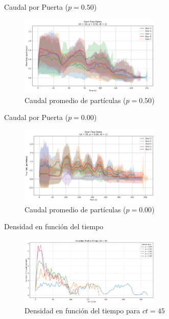 \documentclass[aspectratio=169]{beamer}
\begin{document}
\begin{frame}{Caudal por Puerta ($p=0.50$)}
    \begin{figure}
        \centering
        \includegraphics[width=0.6\textwidth]{img/door_flow_rates_t_20_&_p_0.50.png}
        \caption{Caudal promedio de partículas ($p=0.50$)}
    \end{figure}
\end{frame}

\begin{frame}{Caudal por Puerta ($p=0.00$)}
    \begin{figure}
        \centering
        \includegraphics[width=0.6\textwidth]{img/door_flow_rates_t_20_&_p_0.00.png}
        \caption{Caudal promedio de partículas ($p=0.00$)}
    \end{figure}
\end{frame}


\begin{frame}{Densidad en función del tiempo}
    \begin{figure}
        \centering
        \includegraphics[width=0.6\textwidth]{img/density_vs_time_t45.png}
        \caption{Densidad en función del tiempo para $ct = 45$}
        \label{fig:flow_p100}
    \end{figure}
\end{frame}
\end{document}
